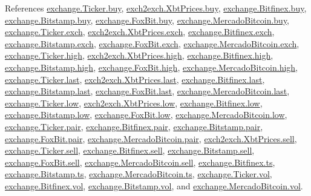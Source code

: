 References \hyperlink{exchange_8py_source_l00058}{exchange.\+Ticker.\+buy}, \hyperlink{exch2exch_8py_source_l00059}{exch2exch.\+Xbt\+Prices.\+buy}, \hyperlink{exchange_8py_source_l00323}{exchange.\+Bitfinex.\+buy}, \hyperlink{exchange_8py_source_l00392}{exchange.\+Bitstamp.\+buy}, \hyperlink{exchange_8py_source_l00464}{exchange.\+Fox\+Bit.\+buy}, \hyperlink{exchange_8py_source_l00526}{exchange.\+Mercado\+Bitcoin.\+buy}, \hyperlink{exchange_8py_source_l00055}{exchange.\+Ticker.\+exch}, \hyperlink{exch2exch_8py_source_l00064}{exch2exch.\+Xbt\+Prices.\+exch}, \hyperlink{exchange_8py_source_l00317}{exchange.\+Bitfinex.\+exch}, \hyperlink{exchange_8py_source_l00389}{exchange.\+Bitstamp.\+exch}, \hyperlink{exchange_8py_source_l00457}{exchange.\+Fox\+Bit.\+exch}, \hyperlink{exchange_8py_source_l00523}{exchange.\+Mercado\+Bitcoin.\+exch}, \hyperlink{exchange_8py_source_l00060}{exchange.\+Ticker.\+high}, \hyperlink{exch2exch_8py_source_l00061}{exch2exch.\+Xbt\+Prices.\+high}, \hyperlink{exchange_8py_source_l00325}{exchange.\+Bitfinex.\+high}, \hyperlink{exchange_8py_source_l00394}{exchange.\+Bitstamp.\+high}, \hyperlink{exchange_8py_source_l00466}{exchange.\+Fox\+Bit.\+high}, \hyperlink{exchange_8py_source_l00528}{exchange.\+Mercado\+Bitcoin.\+high}, \hyperlink{exchange_8py_source_l00062}{exchange.\+Ticker.\+last}, \hyperlink{exch2exch_8py_source_l00063}{exch2exch.\+Xbt\+Prices.\+last}, \hyperlink{exchange_8py_source_l00327}{exchange.\+Bitfinex.\+last}, \hyperlink{exchange_8py_source_l00396}{exchange.\+Bitstamp.\+last}, \hyperlink{exchange_8py_source_l00468}{exchange.\+Fox\+Bit.\+last}, \hyperlink{exchange_8py_source_l00530}{exchange.\+Mercado\+Bitcoin.\+last}, \hyperlink{exchange_8py_source_l00061}{exchange.\+Ticker.\+low}, \hyperlink{exch2exch_8py_source_l00062}{exch2exch.\+Xbt\+Prices.\+low}, \hyperlink{exchange_8py_source_l00326}{exchange.\+Bitfinex.\+low}, \hyperlink{exchange_8py_source_l00395}{exchange.\+Bitstamp.\+low}, \hyperlink{exchange_8py_source_l00467}{exchange.\+Fox\+Bit.\+low}, \hyperlink{exchange_8py_source_l00529}{exchange.\+Mercado\+Bitcoin.\+low}, \hyperlink{exchange_8py_source_l00056}{exchange.\+Ticker.\+pair}, \hyperlink{exchange_8py_source_l00318}{exchange.\+Bitfinex.\+pair}, \hyperlink{exchange_8py_source_l00390}{exchange.\+Bitstamp.\+pair}, \hyperlink{exchange_8py_source_l00458}{exchange.\+Fox\+Bit.\+pair}, \hyperlink{exchange_8py_source_l00524}{exchange.\+Mercado\+Bitcoin.\+pair}, \hyperlink{exch2exch_8py_source_l00058}{exch2exch.\+Xbt\+Prices.\+sell}, \hyperlink{exchange_8py_source_l00059}{exchange.\+Ticker.\+sell}, \hyperlink{exchange_8py_source_l00324}{exchange.\+Bitfinex.\+sell}, \hyperlink{exchange_8py_source_l00393}{exchange.\+Bitstamp.\+sell}, \hyperlink{exchange_8py_source_l00465}{exchange.\+Fox\+Bit.\+sell}, \hyperlink{exchange_8py_source_l00527}{exchange.\+Mercado\+Bitcoin.\+sell}, \hyperlink{exchange_8py_source_l00321}{exchange.\+Bitfinex.\+ts}, \hyperlink{exchange_8py_source_l00391}{exchange.\+Bitstamp.\+ts}, \hyperlink{exchange_8py_source_l00525}{exchange.\+Mercado\+Bitcoin.\+ts}, \hyperlink{exchange_8py_source_l00063}{exchange.\+Ticker.\+vol}, \hyperlink{exchange_8py_source_l00328}{exchange.\+Bitfinex.\+vol}, \hyperlink{exchange_8py_source_l00397}{exchange.\+Bitstamp.\+vol}, and \hyperlink{exchange_8py_source_l00531}{exchange.\+Mercado\+Bitcoin.\+vol}.


